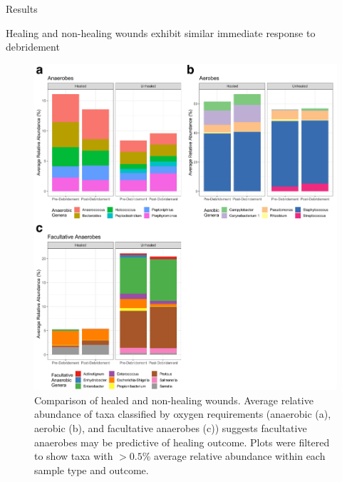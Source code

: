 \documentclass[oneside,12pt,final]{sty/ucthesis-CA2012}
\begin{document}
\begin{mainmatter}
\begin{section}{Results}
\begin{subsection}{Healing and non-healing wounds exhibit similar immediate response to debridement}
\begin{figure}
\centering
\includegraphics[width=\textwidth]{fig/C3fig4ACsq.pdf}
\caption{Comparison of healed and non-healing wounds. Average relative abundance of taxa classified by oxygen requirements (anaerobic (a), aerobic (b), and facultative anaerobes (c)) suggests facultative anaerobes may be predictive of healing outcome. Plots were filtered to show taxa with $> 0.5$\% average relative abundance within each sample type and outcome.}
\label{fig:fig4AC}
\end{figure}
\end{subsection}


\end{section}
\end{mainmatter}
\end{document}
